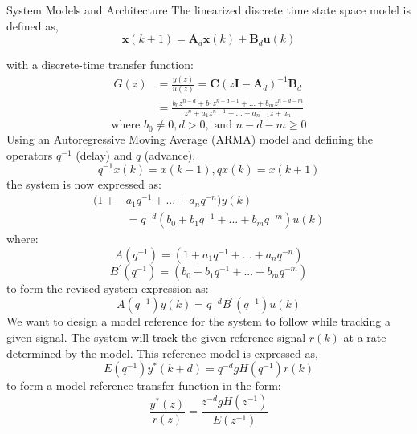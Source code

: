 \begin{section}{System Models and Architecture}
The linearized discrete time state space model is defined as,
    \begin{equation}
	\bm{x}(k+1) = \bm{A}_d\bm{x}(k) + \bm{B}_d\bm{u}(k)
	\end{equation}

with a discrete-time transfer function:
	\begin{align}
        G(z) & = \frac{y(z)}{u(z)} = \bm{C}(z\bm{I}-\bm{A}_d)^{-1}\bm{B}_d  \\
	& = \frac{b_0z^{n-d}+b_1z^{n-d-1} +...+b_mz^{n-d-m}}{z^{n}+a_1z^{n-1}+...+a_{n-1}z+a_n} \nonumber
	\end{align}
	\begin{equation}
	\text{where } b_0\ne{0}, d>0, \text{ and } n-d-m\geq{0} \nonumber
	\end{equation}
Using an Autoregressive Moving Average (ARMA) model and defining the operators $q^{-1}$ (delay) and $q$ (advance),
	\begin{equation}
	q^{-1}x(k) = x(k-1), qx(k) = x(k+1)
	\end{equation}
the system is now expressed as:
    \begin{align}
	(1+&a_1q^{-1}+...+a_nq^{-n})y(k) \nonumber \\
	&=q^{-d}(b_0+b_1q^{-1}+...+b_mq^{-m})u(k)
	\end{align}
where:
	\begin{equation}
	A(q^{-1})=(1+a_1q^{-1}+...+a_nq^{-n}) \nonumber
	\end{equation}
	\begin{equation}
	B^{'}(q^{-1})=(b_0+b_1q^{-1}+...+b_mq^{-m}) \nonumber
	\end{equation}
to form the revised system expression as:
	\begin{equation}
	A(q^{-1})y(k)=q^{-d}B^{'}(q^{-1})u(k)
	\end{equation}
We want to design a model reference for the system to follow while tracking a given signal. The system will track the given reference signal $r(k)$ at a rate determined by the model. This reference model is expressed as,
	\begin{equation}
	E(q^{-1})y^*(k+d)=q^{-d}gH(q^{-1})r(k)
	\end{equation}
to form a model reference transfer function in the form:
	\begin{equation}
	\frac{y^*(z)}{r(z)}=\frac{z^{-d}gH(z^{-1})}{E(z^{-1})}
	\end{equation}



\end{section}
